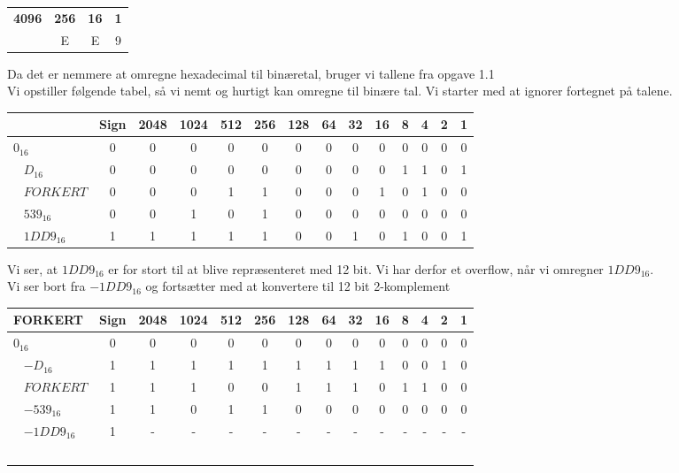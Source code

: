 \documentclass[a4,11pt]{article}
\begin{document}
\begin{center}
  \begin{tabular}{| c | c | c | c |}
    \hline
     \textbf{4096} & \textbf{256} & \textbf{16} & \textbf{1}\\ \hline
    1 & E & E & 9\\
    \hline
  \end{tabular}
\end{center}

Da det er nemmere at omregne hexadecimal til binæretal, bruger vi tallene fra opgave 1.1\\
Vi opstiller følgende tabel, så vi nemt og hurtigt kan omregne til binære tal. Vi starter med at ignorer fortegnet på talene.
\begin{center}
  \begin{tabular}{ | l | c | c | c |  c |  c |  c |  c |  c |  c |  c |  c |  c |  c | }
    \hline
    & Sign & 2048 & 1024 & 512 & 256 & 128 & 64 & 32 & 16 & 8 & 4 & 2 & 1\\ \hline
    $0_{16}$ &        0 & 0 & 0 & 0 & 0 & 0 & 0 & 0 & 0 & 0 & 0 & 0 & 0 \\ \hline
    $D_{16}$ &      0 & 0 & 0 & 0 & 0 & 0 & 0 & 0 & 0 & 1 & 1 & 0 & 1 \\ \hline
    $FORKERT$ &   0 & 0 & 0 & 1 & 1 & 0 & 0 & 0 & 1 & 0 & 1 & 0 & 0 \\ \hline
    $539_{16}$ &   0 & 0 & 1 & 0 & 1 & 0 & 0 & 0 & 0 & 0 & 0 & 0 & 0 \\ \hline
    $1DD9_{16}$ & 1 & 1 & 1 & 1 & 1 & 0 & 0 & 1 & 0 & 1 & 0 & 0 & 1 \\
    \hline
  \end{tabular}
\end{center}

Vi ser, at  $1DD9_{16}$ er for stort til at blive repræsenteret med 12 bit. Vi har derfor et overflow, når vi omregner  $1DD9_{16}$.\\

Vi ser bort fra $-1DD9_{16}$ og fortsætter med at konvertere til 12 bit 2-komplement
\begin{center}
  \begin{tabular}{ | l | c | c | c |  c |  c |  c |  c |  c |  c |  c |  c |  c |  c | }
   \hline
    FORKERT
    & Sign & 2048 & 1024 & 512 & 256 & 128 & 64 & 32 & 16 & 8 & 4 & 2 & 1\\ \hline
    $0_{16}$ &         0 & 0 & 0 & 0 & 0 & 0 & 0 & 0 & 0 & 0 & 0 & 0 & 0 \\ \hline
    $-D_{16}$ &     1 & 1 & 1 & 1 & 1 & 1 & 1 & 1 & 1 & 0 & 0 & 1 & 0 \\ \hline
    $FORKERT$ &   1 & 1 & 1 & 0 & 0 & 1 & 1 & 1 & 0 & 1 & 1 & 0 & 0 \\ \hline
    $-539_{16}$ &   1 & 1 & 0 & 1 & 1 & 0 & 0 & 0 & 0 & 0 & 0 & 0 & 0 \\ \hline
    $-1DD9_{16}$ & 1 & - & - & - & - & - & - & - & - & - & - & - & - \\ \hline
  \end{tabular}
\end{center}
\end{document}
